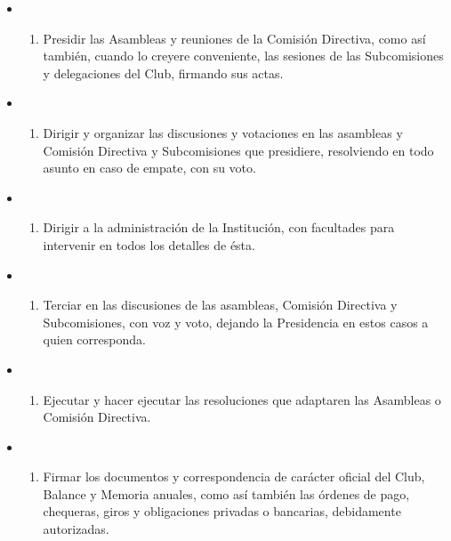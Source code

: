 \documentclass[]{book}
\providecommand{\tightlist}{%
  \setlength{\itemsep}{0pt}\setlength{\parskip}{0pt}}
\begin{document}
\begin{itemize}
  \begin{itemize}
  \item
    \begin{enumerate}
    \def\labelenumi{\alph{enumi})}
    \tightlist
    \item
      Presidir las Asambleas y reuniones de la Comisión Directiva, como así también, cuando lo creyere conveniente, las sesiones de las Subcomisiones y delegaciones del Club, firmando sus actas.
    \end{enumerate}
  \item
    \begin{enumerate}
    \def\labelenumi{\alph{enumi})}
    \setcounter{enumi}{1}
    \tightlist
    \item
      Dirigir y organizar las discusiones y votaciones en las asambleas y Comisión Directiva y Subcomisiones que presidiere, resolviendo en todo asunto en caso de empate, con su voto.
    \end{enumerate}
  \item
    \begin{enumerate}
    \def\labelenumi{\alph{enumi})}
    \setcounter{enumi}{2}
    \tightlist
    \item
      Dirigir a la administración de la Institución, con facultades para intervenir en todos los detalles de ésta.
    \end{enumerate}
  \item
    \begin{enumerate}
    \def\labelenumi{\alph{enumi})}
    \setcounter{enumi}{3}
    \tightlist
    \item
      Terciar en las discusiones de las asambleas, Comisión Directiva y Subcomisiones, con voz y voto, dejando la Presidencia en estos casos a quien corresponda.
    \end{enumerate}
  \item
    \begin{enumerate}
    \def\labelenumi{\alph{enumi})}
    \setcounter{enumi}{4}
    \tightlist
    \item
      Ejecutar y hacer ejecutar las resoluciones que adaptaren las Asambleas o Comisión Directiva.
    \end{enumerate}
  \item
    \begin{enumerate}
    \def\labelenumi{\alph{enumi})}
    \setcounter{enumi}{5}
    \tightlist
    \item
      Firmar los documentos y correspondencia de carácter oficial del Club, Balance y Memoria anuales, como así también las órdenes de pago, chequeras, giros y obligaciones privadas o bancarias, debidamente autorizadas.

\end{enumerate}
\end{itemize}
\end{itemize}
\end{document}
